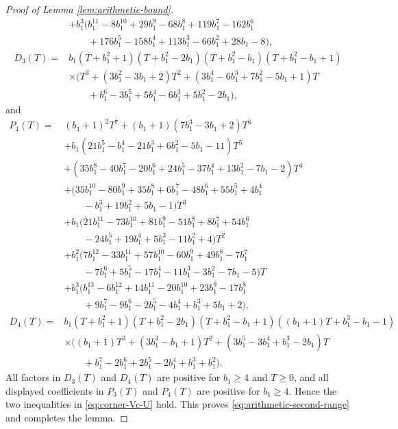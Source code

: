 \documentclass[11pt]{amsart}
\begin{document}
\begin{proof}[Proof of Lemma \ref{lem:arithmetic-bound}]
\begin{align*}
        &+b_1^3(b_1^{11}-8b_1^{10}+29b_1^9-68b_1^8+119b_1^7-162b_1^6\\
        &\qquad +176b_1^5-158b_1^4+113b_1^3-66b_1^2+28b_1-8),\\[3pt]
D_3(T)={}&b_1(T+b_1^2+1)(T+b_1^2-2b_1)(T+b_1^2-b_1)(T+b_1^2-b_1+1)\\
        &\times\bigl(T^3+(3b_1^2-3b_1+2)T^2+(3b_1^4-6b_1^3+7b_1^2-5b_1+1)T\\
        &\qquad +b_1^6-3b_1^5+5b_1^4-6b_1^3+5b_1^2-2b_1\bigr),
\end{align*}
and
\begin{align*}
P_4(T)={}&(b_1+1)^2T^7+(b_1+1)(7b_1^3-3b_1+2)T^6\\
        &+b_1(21b_1^5-b_1^4-21b_1^3+6b_1^2-5b_1-11)T^5\\
        &+(35b_1^8-40b_1^7-20b_1^6+24b_1^5-37b_1^4+13b_1^2-7b_1-2)T^4\\
        &+(35b_1^{10}-80b_1^9+35b_1^8+6b_1^7-48b_1^6+55b_1^5+4b_1^4\\
        &\qquad -b_1^3+19b_1^2+5b_1-1)T^3\\
        &+b_1(21b_1^{11}-73b_1^{10}+81b_1^9-51b_1^8+8b_1^7+54b_1^6\\
        &\qquad -24b_1^5+19b_1^4+5b_1^3-11b_1^2+4)T^2\\
        &+b_1^2(7b_1^{12}-33b_1^{11}+57b_1^{10}-60b_1^9+49b_1^8-7b_1^7\\
        &\qquad -7b_1^6+5b_1^5-17b_1^4-11b_1^3-3b_1^2-7b_1-5)T\\
        &+b_1^3(b_1^{13}-6b_1^{12}+14b_1^{11}-20b_1^{10}+23b_1^9-17b_1^8\\
        &\qquad +9b_1^7-9b_1^6-2b_1^5-4b_1^4+b_1^3+5b_1+2),\\[3pt]
D_4(T)={}&b_1(T+b_1^2+1)(T+b_1^2-2b_1)(T+b_1^2-b_1+1)((b_1+1)T+b_1^3-b_1-1)\\
        &\times\bigl((b_1+1)T^3+(3b_1^3-b_1+1)T^2+(3b_1^5-3b_1^4+b_1^3-2b_1)T\\
        &\qquad +b_1^7-2b_1^6+2b_1^5-2b_1^4+b_1^3+b_1^2\bigr).
\end{align*}
All factors in $D_3(T)$ and $D_4(T)$ are positive for $b_1\ge4$ and $T\ge0$, and all displayed coefficients in $P_3(T)$ and $P_4(T)$ are positive for $b_1\ge4$.  Hence the two
inequalities in \eqref{eq:corner-Vc-U} hold.  This proves \eqref{eq:arithmetic-second-range} and completes the lemma.

\end{proof}
\end{document}
